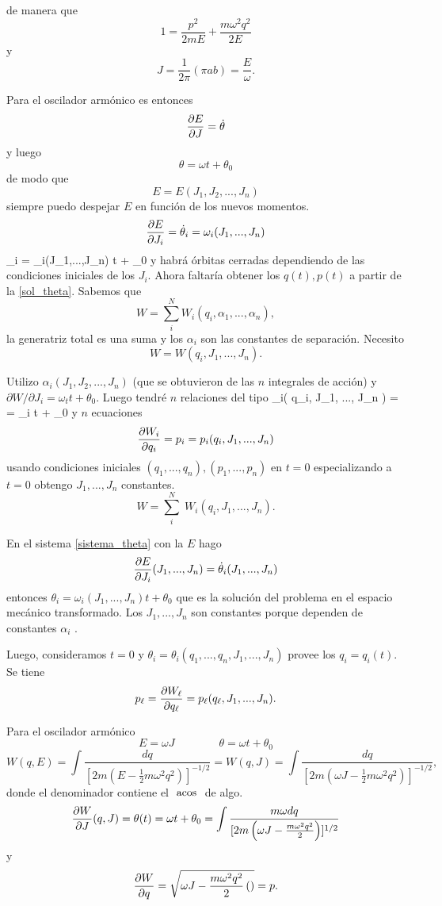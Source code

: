 \documentclass[10pt,oneside]{CBFT_book}
\begin{document}
de manera que
\[
	1 = \frac{p^2}{2mE} + \frac{m\omega^2 q^2}{2E}
\]
y
\[
	J = \frac{1}{2\pi}(\pi a b )= \frac{E}{\omega}.
\]

Para el oscilador armónico es entonces
\[
	\frac{\partial^{\hspace{-0.05em}} {E}}{\partial {J}^{\hspace{-0.05em}}} = \dot{\theta}
\]
y luego
\[
	\theta = \omega t + \theta_0
\]
de modo que 
\[
	E = E(J_1, J_2, ..., J_n)
\]
siempre puedo despejar $E$ en función de los nuevos momentos.
\[
	\frac{\partial^{\hspace{-0.05em}} {E}}{\partial {J_i}^{\hspace{-0.05em}}} = \dot{\theta}_i = \omega_i(J_1,...,J_n)
\]
\be
	\theta_i = \omega_i(J_1,...,J_n) t + \theta_0
	\label{sol_theta}
\ee
y habrá órbitas cerradas dependiendo de las condiciones iniciales de los $J_i$.
Ahora faltaría obtener los $q(t),p(t)$ a partir de la  \eqref{sol_theta}. Sabemos que 
\[
	W = \sum_i^N W_i(q_i,\alpha_1,...,\alpha_n),
\]
la generatriz total es una suma y los $\alpha_i$ son las constantes de separación. Necesito
\[
	W = W( q_i, J_1, ..., J_n ).
\]

Utilizo $\alpha_i( J_1, J_2, ..., J_n )$ (que se obtuvieron de las $n$ integrales de acción) y $\partial W /\partial J_i = \omega_t t + \theta_0 $.
Luego tendré $n$ relaciones del tipo
\be
	\theta_i( q_i, J_1, ..., J_n ) =  = \omega_i t + \theta_0
	\label{sistema_theta}
\ee
y $n$ ecuaciones 
\[
	\frac{\partial^{\hspace{-0.05em}} {W_i}}{\partial {q_i}^{\hspace{-0.05em}}} = p_i = p_i( q_i, J_1, ..., J_n ) 
\]
usando condiciones iniciales $(q_1, ..., q_n), (p_1, ..., p_n)$ en $t=0$ especializando a $t=0$ obtengo $J_1, ..., J_n$ constantes.
\[
	W = \sum_i^N \; W_i(q_i,J_1,...,J_n). 
\]

En el sistema \eqref{sistema_theta} con la $E$ hago 
\[
	\frac{\partial^{\hspace{-0.05em}} {E}}{\partial {J_i}^{\hspace{-0.05em}}}(J_1,...,J_n) = \dot{\theta}_i(J_1,...,J_n)
\]
entonces $\theta_i = \omega_i (J_1,...,J_n) t + \theta_0$ que es la solución del problema en el espacio mecánico transformado.
Los $J_1,...,J_n$ son constantes porque dependen de constantes $\alpha_i$ .

Luego, consideramos $t=0$ y $\theta_i = \theta_i ( q_1,...,q_n,J_1,...,J_n)$ provee los $q_i = q_i(t)$. Se tiene 
\[
	p_\ell = \frac{\partial^{\hspace{-0.05em}} {W_\ell}}{\partial {q_\ell}^{\hspace{-0.05em}}} = p_\ell( q_\ell, J_1, ..., J_n ).
\]

Para el oscilador armónico
\[
	E = \omega J \qquad \qquad \theta = \omega t + \theta_0
\]
\[
	W(q,E) = \int \frac{dq}{ [ 2 m \left( E - \frac{1}{2} m \omega^2 q^2 \right) ]^{-1/2} } = 
	W(q,J) = \int \frac{dq}{ [ 2 m \left( \omega J - \frac{1}{2} m \omega^2 q^2 \right) ]^{-1/2} },
\]
donde el denominador contiene el $\text{ acos }$ de algo.
\[
	\frac{\partial^{\hspace{-0.05em}} {W}}{\partial {J}^{\hspace{-0.05em}}}(q,J) = \theta (t) = \omega t + \theta_0 = \int \frac{ m \omega dq }{ [ 2 m \left( \omega J - \frac{ m \omega^2 q^2 }{2} \right) ]^{1/2} }
\]
y
\[
	\frac{\partial^{\hspace{-0.05em}} {W}}{\partial {q}^{\hspace{-0.05em}}} = \sqrt{ \omega J - \frac{ m \omega^2 q^2 }{2} \left( \right) } = p.
\]
\end{document}
